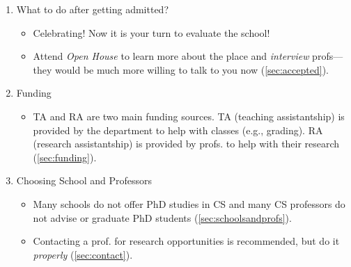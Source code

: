 \documentclass[oneside,11pt]{book}
\begin{document}
\begin{enumerate}
\begin{itemize}
        \end{itemize}
  \item What to do after getting admitted?
        \begin{itemize}
                \item  Celebrating! Now it is your turn to evaluate the school!
          \item Attend \emph{Open House} to learn more about the place and \emph{interview} profs---they would be much more willing to talk to you now (\autoref{sec:accepted}).
        \end{itemize}
  \item Funding
        \begin{itemize}
          \item TA and RA are two main funding sources.  TA (teaching assistantship) is provided by the department to help with classes (e.g., grading). RA (research assistantship) is provided by profs. to help with their research (\autoref{sec:funding}).
        \end{itemize}
  \item Choosing School and Professors
        \begin{itemize}
          \item Many schools do not offer PhD studies in CS and many CS professors do not advise or graduate PhD students  (\autoref{sec:schoolsandprofs}).
          \item Contacting a prof. for research opportunities is recommended, but do it \emph{properly} (\autoref{sec:contact}).
        \end{itemize}
  

\end{enumerate}
\end{document}
